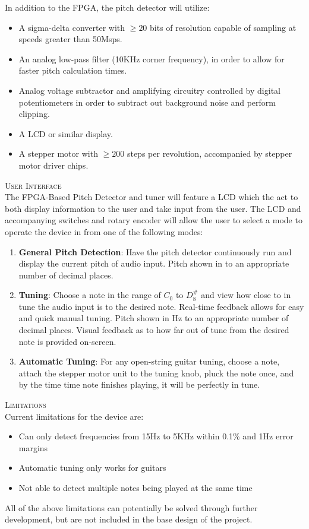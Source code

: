 \documentclass[aps,letterpaper,10pt]{revtex4}
\begin{document}
In addition to the FPGA, the pitch detector will utilize:
\begin{itemize}
\item A sigma-delta converter with $\geq 20$ bits of resolution capable of sampling at speeds greater than 50Msps. 
\item An analog low-pass filter (10KHz corner frequency), in order to allow for faster pitch calculation times. 
\item Analog voltage subtractor and amplifying circuitry controlled by digital potentiometers in order to subtract out background noise and perform clipping. 
\item A LCD or similar display.
\item A stepper motor with $\geq 200$ steps per revolution, accompanied by stepper motor driver chips. 
\end{itemize}

\noindent \textsc{\large User Interface}\\

The FPGA-Based Pitch Detector and tuner will feature a LCD which the act to both display information to the user and take input from the user. The LCD and accompanying switches and rotary encoder will allow the user to select a mode to operate the device in from one of the following modes:
\begin{enumerate}
\item \textbf{General Pitch Detection}: Have the pitch detector continuously run and display the current pitch of audio input. Pitch shown in to an appropriate number of decimal places. 
\item \textbf{Tuning}: Choose a note in the range of  $C_0$ to $D^\#_8$ and view how close to in tune the audio input is to the desired note. Real-time feedback allows for easy and quick manual tuning. Pitch shown in Hz to an appropriate number of decimal places. Visual feedback as to how far out of tune from the desired note is provided on-screen.
\item \textbf{Automatic Tuning}: For any open-string guitar tuning, choose a note, attach the stepper motor unit to the tuning knob, pluck the note once, and by the time time note finishes playing, it will be perfectly in tune. 
\end{enumerate}

\noindent \textsc{\large Limitations}\\

Current limitations for the device are:
\begin{itemize}
\item Can only detect frequencies from 15Hz to 5KHz within 0.1\% and 1Hz error margins
\item Automatic tuning only works for guitars
\item Not able to detect multiple notes being played at the same time
\end{itemize}
All of the above limitations can potentially be solved through further development, but are not included in the base design of the project. 
\end{document}
